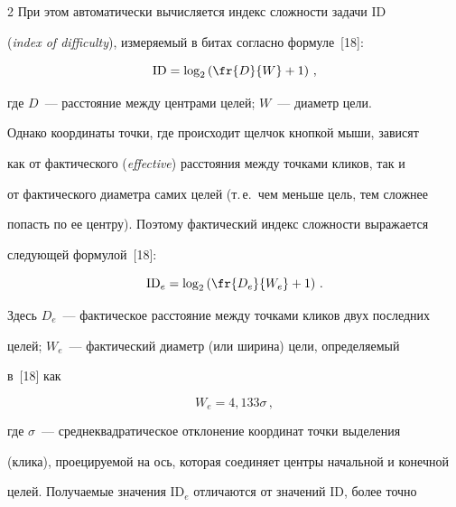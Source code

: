 \begin{multicols}{2}
При этом автоматически вычисляется индекс сложности задачи ID


(\textit{index of difficulty}), измеряемый в битах согласно формуле~[18]:


  \begin{equation}


\mathrm{ID}=\log_2 \left( \fr{D}{W}+1\right)\,,


  \label{e1kar}


  \end{equation}


где $D$~--- расстояние между центрами целей; $W$~--- диаметр цели. 


  


  Однако координаты точки, где происходит щелчок кнопкой мыши, зависят 


как от фактического (\textit{effective}) расстояния между точками кликов, так и 


от фактического диаметра самих целей (т.\,е.\ чем меньше цель, тем сложнее 


попасть по ее центру). Поэтому фактический индекс сложности выражается 


следующей формулой~[18]: 


  \begin{equation}


\mathrm{ID}_e=\log_2\left( \fr{D_e}{W_e}+1\right)\,.


  \label{e2kar}


  \end{equation}


Здесь $D_e$~--- фактическое расстояние между точками кликов двух последних 


целей; $W_e$~--- фактический диаметр (или ширина) цели, определяемый 


в~[18] как


\begin{equation}


W_e=4{,}133 \sigma\,,


\label{e3kar}


\end{equation}


где $\sigma$~--- среднеквадратическое отклонение координат точки выделения 


(клика), проецируемой на ось, которая соединяет центры начальной и конечной 


целей. Получаемые значения ID$_e$ отличаются от значений ID, более точно 



\end{multicols}
